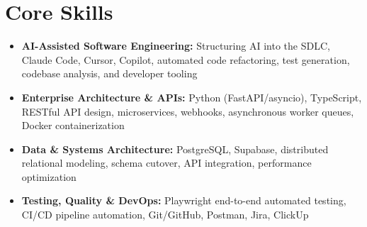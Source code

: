 \documentclass[a4paper,10pt]{article}
\begin{document}
\section{Core Skills}
\begin{itemize}
 \item \textbf{AI-Assisted Software Engineering:} Structuring AI into the SDLC, Claude Code, Cursor, Copilot, automated code refactoring, test generation, codebase analysis, and developer tooling
 \item \textbf{Enterprise Architecture \& APIs:} Python (FastAPI/asyncio), TypeScript, RESTful API design, microservices, webhooks, asynchronous worker queues, Docker containerization
 \item \textbf{Data \& Systems Architecture:} PostgreSQL, Supabase, distributed relational modeling, schema cutover, API integration, performance optimization
 \item \textbf{Testing, Quality \& DevOps:} Playwright end-to-end automated testing, CI/CD pipeline automation, Git/GitHub, Postman, Jira, ClickUp
\end{itemize}
\end{document}
